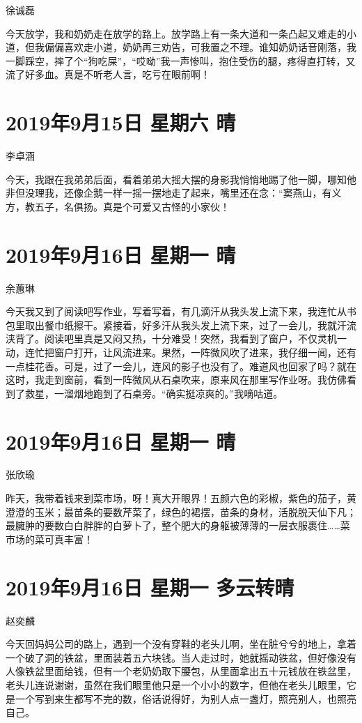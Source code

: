 徐诚磊

今天放学，我和奶奶走在放学的路上。放学路上有一条大道和一条凸起又难走的小道，但我偏偏喜欢走小道，奶奶再三劝告，可我置之不理。谁知奶奶话音刚落，我一脚踩空，摔了个``狗吃屎''，``哎呦''我一声惨叫，抱住受伤的腿，疼得直打转，又流了好多血。真是不听老人言，吃亏在眼前啊！

\section{2019年9月15日 星期六 晴}

李卓涵

今天，我跟在我弟弟后面，看着弟弟大摇大摆的身影我悄悄地踢了他一脚，哪知他非但没理我，还像企鹅一样一摇一摆地走了起来，嘴里还在念：``窦燕山，有义方，教五子，名俱扬。真是个可爱又古怪的小家伙！

\section{2019年9月16日 星期一 晴}

余蕙琳

今天我又到了阅读吧写作业，写着写着，有几滴汗从我头发上流下来，我连忙从书包里取出餐巾纸擦干。紧接着，好多汗从我头发上流下来，过了一会儿，我就汗流浃背了。阅读吧里真是又闷又热，十分难受！突然，我看到了窗户，不仅灵机一动，连忙把窗户打开，让风流进来。果然，一阵微风吹了进来，我仔细一闻，还有一点桂花香。可是，过了一会儿，连风的影子也没有了。难道风也回家了吗？就在这时，我走到窗前，看到一阵微风从石桌吹来，原来风在那里写作业呀。我仿佛看到了救星，一溜烟地跑到了石桌旁。``确实挺凉爽的。''我嘀咕道。

\section{2019年9月16日 星期一 晴}

张欣瑜

昨天，我带着钱来到菜市场，呀！真大开眼界！五颜六色的彩椒，紫色的茄子，黄澄澄的玉米；最苗条的要数芹菜了，绿色的裙摆，苗条的身材，活脱脱天仙下凡；最臃肿的要数白白胖胖的白萝卜了，整个肥大的身躯被薄薄的一层衣服裹住\ldots\ldots 菜市场的菜可真丰富！

\section{2019年9月16日 星期一 多云转晴}

赵奕麟

今天回妈妈公司的路上，遇到一个没有穿鞋的老头儿啊，坐在脏兮兮的地上，拿着一个破了洞的铁盆，里面装着五六块钱。当人走过时，她就摇动铁盆，但好像没有人像铁盆里面给钱，但有一个老奶奶取下腰包，从里面拿出五十元钱放在铁盆里，老头儿连说谢谢，虽然在我们眼里他只是一个小小的数字，但他在老头儿眼里，它是一个写到来生都写不完的数，俗话说得好，为别人点一盏灯，照亮别人，也照亮自己。

